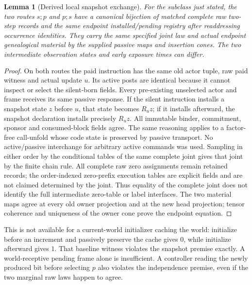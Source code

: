 \documentclass{article}
\newtheorem{lemma}{Lemma}
\begin{document}
\begin{lemma}[Derived local snapshot exchange]\label{lem:exchange}
For the subclass just stated, the two routes $s;p$ and $p;s$ have a canonical bijection of matched complete raw two-step records and the same endpoint installed/pending registry after readdressing occurrence identities. They carry the same specified joint law and actual endpoint genealogical material by the supplied passive maps and insertion cones. The two intermediate observation states and early exposure times can differ.
\end{lemma}
\begin{proof}
On both routes the paid instruction has the same old actor tuple, raw paid witness and actual update $u$. Its active posts are identical because it cannot inspect or select the silent-born fields. Every pre-existing unselected actor and frame receives its same passive response. If the silent instruction installs a snapshot state $z$ before $u$, that state becomes $R_u z$; if it installs afterward, the snapshot declaration installs precisely $R_u z$. All immutable binder, commitment, sponsor and consumed-block fields agree. The same reasoning applies to a factor-free call-unfold whose code state is preserved by passive transport. No active/passive interchange for arbitrary active commands was used. Sampling in either order by the conditional tables of the same complete joint gives that joint by the finite chain rule. All complete raw zero assignments remain retained records; the order-indexed zero-prefix execution tables are explicit fields and are not claimed determined by the joint. Thus equality of the complete joint does not identify the full intermediate zero-table or label interfaces. The two material maps agree at every old owner projection and at the new head projection; tensor coherence and uniqueness of the owner cone prove the endpoint equation.
\end{proof}

This is not available for a current-world initializer caching the world: initialize before an increment and passively preserve the cache gives $0$, while initialize afterward gives $1$. That baseline witness violates the snapshot premise exactly. A world-receptive pending frame alone is insufficient. A controller reading the newly produced bit before selecting $p$ also violates the independence premise, even if the two marginal raw laws happen to agree.
\end{document}
